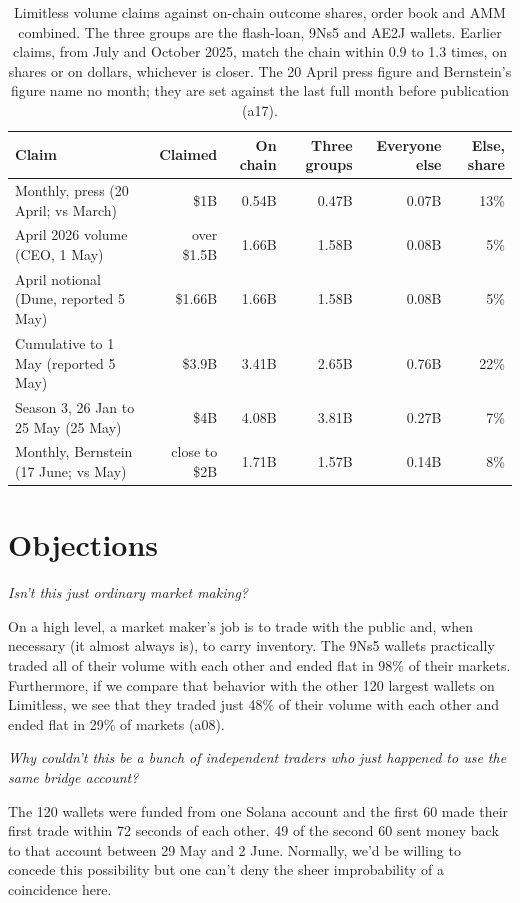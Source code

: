\documentclass[11pt]{article}
\begin{document}
\begin{table}[h]
\centering
\footnotesize \setlength{\tabcolsep}{4pt}
\begin{tabular}{lrrrrr}
\toprule
Claim & Claimed & On chain & Three groups & Everyone else & Else, share \\
\midrule
Monthly, press (20 April; vs March) & \$1B & 0.54B & 0.47B & 0.07B & 13\% \\
April 2026 volume (CEO, 1 May) & over \$1.5B & 1.66B & 1.58B & 0.08B & 5\% \\
April notional (Dune, reported 5 May) & \$1.66B & 1.66B & 1.58B & 0.08B & 5\% \\
Cumulative to 1 May (reported 5 May) & \$3.9B & 3.41B & 2.65B & 0.76B & 22\% \\
Season 3, 26 Jan to 25 May (25 May) & \$4B & 4.08B & 3.81B & 0.27B & 7\% \\
Monthly, Bernstein (17 June; vs May) & close to \$2B & 1.71B & 1.57B & 0.14B & 8\% \\
\bottomrule
\end{tabular}
\caption{Limitless volume claims against on-chain outcome shares, order book and AMM combined.
The three groups are the flash-loan, 9Ns5 and AE2J wallets.
Earlier claims, from July and October 2025, match the chain within 0.9 to 1.3 times, on shares or on dollars, whichever is closer.
The 20 April press figure and Bernstein's figure name no month; they are set against the last full month before publication (a17).}
\label{tab:claims}
\end{table}

\section{Objections}

\emph{Isn't this just ordinary market making?}

On a high level, a market maker's job is to trade with the public and, when necessary (it almost always is), to carry inventory.
The 9Ns5 wallets practically traded all of their volume with each other and ended flat in 98\% of their markets.
Furthermore, if we compare that behavior with the other 120 largest wallets on Limitless, we see that they traded just 48\% of their volume with each other and ended flat in 29\% of markets (a08).

\emph{Why couldn't this be a bunch of independent traders who just happened to use the same bridge account?}

The 120 wallets were funded from one Solana account and the first 60 made their first trade within 72 seconds of each other. 49 of the second 60 sent money back to that account between 29 May and 2 June.
Normally, we'd be willing to concede this possibility but one can't deny the sheer improbability of a coincidence here.
\end{document}
